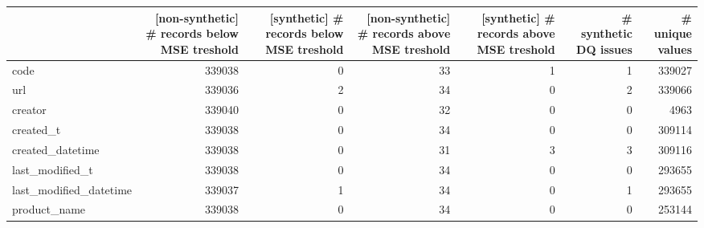 \begin{tabular}{lrrrrrr}
\toprule
{} &  [non-synthetic] \# records below MSE treshold &  [synthetic] \# records below MSE treshold &  [non-synthetic] \# records above MSE treshold &  [synthetic] \# records above MSE treshold &  \# synthetic DQ issues &  \# unique values \\
\midrule
code                                       &                                        339038 &                                         0 &                                            33 &                                         1 &                      1 &           339027 \\
url                                        &                                        339036 &                                         2 &                                            34 &                                         0 &                      2 &           339066 \\
creator                                    &                                        339040 &                                         0 &                                            32 &                                         0 &                      0 &             4963 \\
created\_t                                  &                                        339038 &                                         0 &                                            34 &                                         0 &                      0 &           309114 \\
created\_datetime                           &                                        339038 &                                         0 &                                            31 &                                         3 &                      3 &           309116 \\
last\_modified\_t                            &                                        339038 &                                         0 &                                            34 &                                         0 &                      0 &           293655 \\
last\_modified\_datetime                     &                                        339037 &                                         1 &                                            34 &                                         0 &                      1 &           293655 \\
product\_name                               &                                        339038 &                                         0 &                                            34 &                                         0 &                      0 &           253144 \\

\end{tabular}
